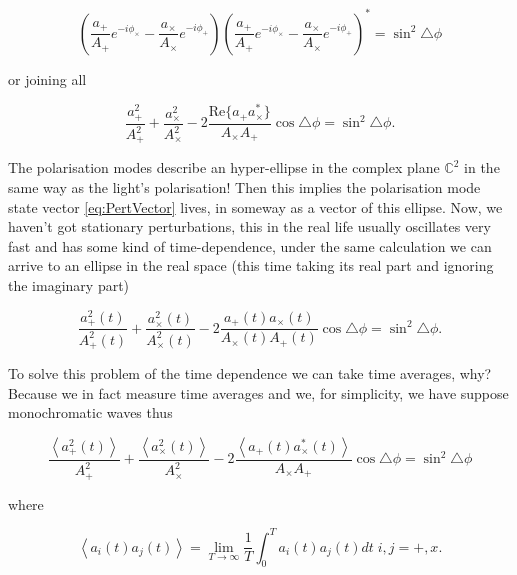             \begin{equation}
                \left(\frac{a_+}{A_+}e^{-i\phi_{\times}}-  \frac{a_{\times}}{A_{\times}}e^{-i\phi_+}\right)\left(\frac{a_+}{A_+}e^{-i\phi_{\times}}-  \frac{a_{\times}}{A_{\times}}e^{-i\phi_+}\right)^* = \sin^2\triangle\phi
            \end{equation}

            or joining all

            \begin{equation}\label{eq:Ellipse}
                \frac{a_+^2}{A_+^2} + \frac{a_{\times}^2}{A_{\times}^2} - 2\frac{\mathrm{Re}\{a_+a_{\times}^*\}}{A_{\times}A_+}\cos\triangle\phi = \sin^2\triangle\phi.
            \end{equation}

            The polarisation modes describe an hyper-ellipse in the complex plane $\mathbb{C}^2$ in the same way as the light's polarisation! Then this implies the polarisation mode state vector \ref{eq:PertVector} lives, in someway as a vector of this ellipse. Now, we haven't got stationary perturbations, this in the real life usually oscillates very fast and has some kind of time-dependence, under the same calculation we can arrive to an ellipse in the real space (this time taking its real part and ignoring the imaginary part) 

            \begin{equation}
                \frac{a_+^2(t)}{A_+^2(t)} + \frac{a_{\times}^2(t)}{A_{\times}^2(t)} - 2\frac{a_+(t)a_{\times}(t)}{A_{\times}(t)A_+(t)}\cos\triangle\phi = \sin^2\triangle\phi.
            \end{equation}

            To solve this problem of the time dependence we can take time averages, why? Because we in fact measure time averages and we, for simplicity, we have suppose monochromatic waves thus

            \begin{equation}\label{eq:EllipseDeT}
                \frac{\left<a_+^2(t)\right>}{A_+^2} + \frac{\left<a_{\times}^2(t)\right>}{A_{\times}^2} - 2\frac{\left<a_+(t)a_{\times}^*(t)\right>}{A_{\times}A_+}\cos\triangle\phi = \sin^2\triangle\phi
            \end{equation}

            where

            \begin{equation}
                \left<a_i(t)a_j(t) \right> = \lim_{T\to\infty} \frac{1}{T}\int_0^Ta_i(t)a_j(t)dt\;i,j=+,x.
            \end{equation}

